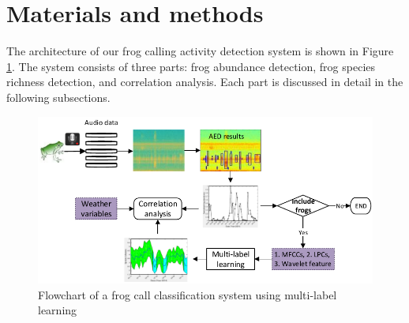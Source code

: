   





\section{Materials and methods}
The architecture of our frog calling activity detection system is shown in Figure \ref{fig:Ch7_flowchart}. The system consists of three parts: frog abundance detection, frog species richness detection, and correlation analysis. Each part is discussed in detail in the following subsections.

\begin{figure}[htb!]
\centering
\includegraphics[width=\textwidth]{image/Ch7/flowchart.pdf}
\caption{Flowchart of a frog call classification system using multi-label learning}
\label{fig:Ch7_flowchart}
\end{figure}


